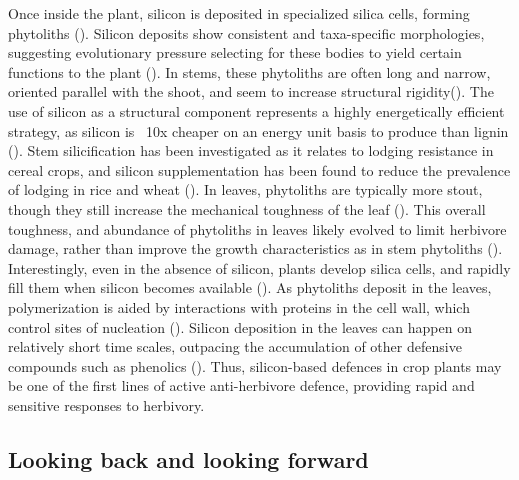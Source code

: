 \documentclass[12pt, letterpaper, ]{article}
\begin{document}
Once inside the plant, silicon is deposited in specialized silica cells, forming phytoliths (\cite{waterman_short-term_2021}). Silicon deposits show consistent and taxa-specific morphologies, suggesting evolutionary pressure selecting for these bodies to yield certain functions to the plant (\cite{piperno_phytoliths_2006}). In stems, these phytoliths are often long and narrow, oriented parallel with the shoot, and seem to increase structural rigidity(\cite{stromberg_functions_2016}). The use of silicon as a structural component represents a highly energetically efficient strategy, as silicon is ~10x cheaper on an energy unit basis to produce than lignin (\cite{stromberg_functions_2016}). Stem silicification has been investigated as it relates to lodging resistance in cereal crops, and silicon supplementation has been found to reduce the prevalence of lodging in rice and wheat (\cite{dorairaj_influence_2017,muszynska_mechanistic_2021}). In leaves, phytoliths are typically more stout, though they still increase the mechanical toughness of the leaf (\cite{simpson_still_2017}). This overall toughness, and abundance of phytoliths in leaves likely evolved to limit herbivore damage, rather than improve the growth characteristics as in stem phytoliths (\cite{stromberg_functions_2016}). Interestingly, even in the absence of silicon, plants develop silica cells, and rapidly fill them when silicon becomes available (\cite{waterman_short-term_2021-1}). As phytoliths deposit in the leaves, polymerization is aided by interactions with proteins in the cell wall, which control sites of nucleation (\cite{nawaz_phytolith_2019}). Silicon deposition in the leaves can happen on relatively short time scales, outpacing the accumulation of other defensive compounds such as phenolics (\cite{waterman_short-term_2021}). Thus, silicon-based defences in crop plants may be one of the first lines of active anti-herbivore defence, providing rapid and sensitive responses to herbivory. 

\subsection{Looking back and looking forward}
\end{document}
